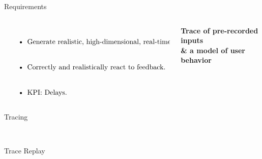 \documentclass[aspectratio=1610]{beamer}
\begin{document}
\normalpage
\begin{frame}{Requirements}
    \begin{columns}[onlytextwidth]
        \begin{column}{.5\linewidth}
            $\left.
                \begin{tabular}{p{.8\linewidth}}
                    \begin{itemize}
                        \itemsep2em
                        \item Generate realistic, high-dimensional, real-time inputs.
                        \item Correctly and realistically react to feedback.
                        \item KPI: Delays.
                    \end{itemize}
                \end{tabular}%
                \right\}$
        \end{column}%
        \begin{column}{.5\linewidth}
            \centering%
            \Large\bfseries%
            Trace of pre-recorded inputs\\
            \& a model of user behavior\\
        \end{column}
    \end{columns}
\end{frame}

\begin{frame}{Tracing}
    \begin{center}
        \\
    \end{center}
\end{frame}

\begin{frame}{Trace Replay}
    \begin{center}
        \\
    \end{center}
\end{frame}
\end{document}
